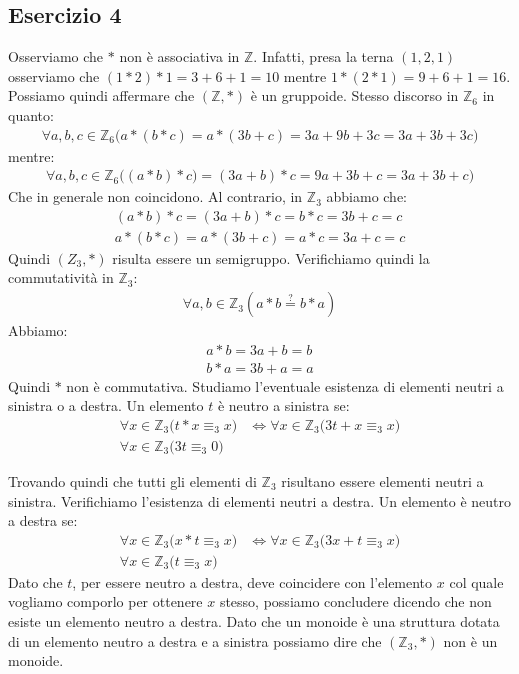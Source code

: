 \subsection*{Esercizio 4}
Osserviamo che $\ast$ non è associativa in $\mathbb{Z}$. Infatti, presa la terna $(1,2,1)$ osserviamo che $(1 \ast 2) \ast 1 = 3+6+1=10$ mentre $1 \ast (2 \ast 1) = 9+6+1=16$. Possiamo quindi affermare che $(\mathbb{Z},\ast)$ è un gruppoide. Stesso discorso in $\mathbb{Z}_{6}$ in quanto:
\begin{align*}
	\forall a,b,c \in \mathbb{Z}_{6} \bigl( a \ast (b \ast c) = a \ast (3b +c) = 3a + 9b + 3c = 3a + 3b + 3c\bigr)
\end{align*}
mentre:
\begin{align*}
	\forall a,b,c \in \mathbb{Z}_{6} \bigl( (a \ast b) \ast c) = (3a+b) \ast c = 9a+3b+c = 3a+3b+c \bigr)
\end{align*}
Che in generale non coincidono. Al contrario, in $\mathbb{Z}_{3}$ abbiamo che:
\begin{align*}
	(a \ast b) \ast c = (3a+b) \ast c = b \ast c = 3b+c = c \\
	a \ast (b \ast c) = a \ast (3b+c) = a \ast c = 3a+c = c
\end{align*}
Quindi $(Z_{3},\ast)$ risulta essere un semigruppo. Verifichiamo quindi la commutatività in $\mathbb{Z}_{3}$:
\begin{align*}
	\forall a,b \in \mathbb{Z}_{3}(a \ast b \stackrel{?}{=} b \ast a)
\end{align*}
Abbiamo:
\begin{align*}
	a \ast b = 3a+b=b\\
	b \ast a = 3b+a=a
\end{align*}
Quindi $\ast$ non è commutativa. Studiamo l'eventuale esistenza di elementi neutri a sinistra o a destra. Un elemento $t$ è neutro a sinistra se:
\begin{align*}
	\forall x \in \mathbb{Z}_{3} \bigl(t \ast x \equiv_{3} x\bigr) &\iff 	\forall x \in \mathbb{Z}_{3} \bigl(3t+x \equiv_{3} x\bigr) \\
	\forall x \in \mathbb{Z}_{3} \bigl(3t \equiv_{3} 0 \bigr)
\end{align*}

Trovando quindi che tutti gli elementi di $\mathbb{Z}_{3}$ risultano essere elementi neutri a sinistra. Verifichiamo l'esistenza di elementi neutri a destra. Un elemento è neutro a destra se:
\begin{align*}
	\forall x \in \mathbb{Z}_{3} \bigl(x \ast t \equiv_{3} x\bigr) &\iff 	\forall x \in \mathbb{Z}_{3} \bigl(3x+t \equiv_{3} x\bigr) \\
	\forall x \in \mathbb{Z}_{3} \bigl(t \equiv_{3} x\bigr)
\end{align*}
Dato che $t$, per essere neutro a destra, deve coincidere con l'elemento $x$ col quale vogliamo comporlo per ottenere $x$ stesso, possiamo concludere dicendo che non esiste un elemento neutro a destra. Dato che un monoide è una struttura dotata di un elemento neutro a destra e a sinistra possiamo dire che $(\mathbb{Z}_{3},\ast)$ non è un monoide.
